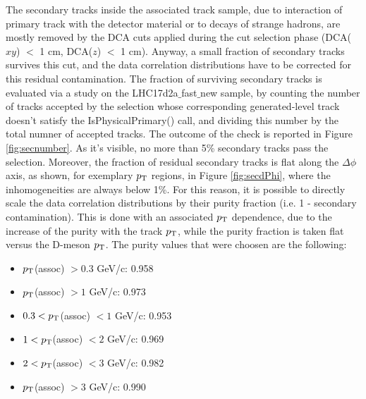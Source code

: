 \label{secondaries}
The secondary tracks inside the associated track sample, due to interaction of primary track with the detector material or to decays of strange hadrons, are mostly removed by the DCA cuts applied during the cut selection phase (DCA($xy$) $<$ 1 cm, DCA($z$) $<$ 1 cm).
Anyway, a small fraction of secondary tracks survives this cut, and the data correlation distributions have to be corrected for this residual contamination.
The fraction of surviving secondary tracks is evaluated via a study on the LHC17d2a$\_$fast$\_$new sample, by counting the number of tracks accepted by the selection whose corresponding generated-level track doesn't satisfy the IsPhysicalPrimary() call, and dividing this number by the total numner of accepted tracks.
The outcome of the check is reported in Figure \ref{fig:secnumber}. As it's visible, no more than 5\% secondary tracks pass the selection. Moreover, the fraction of residual secondary tracks is flat along the $\Delta\phi$ axis, as shown, for exemplary $p_{\rm T}$ regions, in Figure \ref{fig:secdPhi}, where the inhomogeneities are always below 1\%.
For this reason, it is possible to directly scale the data correlation distributions by their purity fraction (i.e. 1 - secondary contamination). This is done with an associated $p_{\rm T}$ dependence, due to the increase of the purity with the track $p_{\rm T}$, while the purity fraction is taken flat versus the D-meson $p_{\rm T}$.
The purity values that were choosen are the following:
\begin{itemize}
  \item $p_{\rm T}$(assoc) $> 0.3$ GeV/c: 0.958
  \item $p_{\rm T}$(assoc) $> 1$ GeV/c: 0.973
  \item $0.3 < p_{\rm T}$(assoc) $< 1$ GeV/c: 0.953
  \item $1 < p_{\rm T}$(assoc) $< 2$ GeV/c: 0.969
  \item $2 < p_{\rm T}$(assoc) $< 3$ GeV/c: 0.982
  \item $p_{\rm T}$(assoc) $> 3$ GeV/c: 0.990
\end{itemize}


